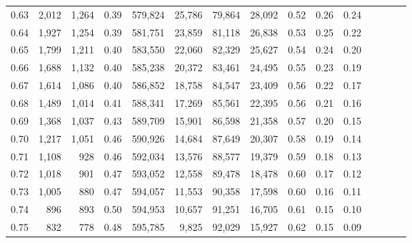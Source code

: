\begin{tabular}{rrrcrrrrrrrrrrr}
0.63 &   2,012 &  1,264 &                                       0.39 &  579,824 &   25,786 &   79,864 &   28,092 &  0.52 &  0.26 &                         0.24 \\
0.64 &   1,927 &  1,254 &                                       0.39 &  581,751 &   23,859 &   81,118 &   26,838 &  0.53 &  0.25 &                         0.22 \\
0.65 &   1,799 &  1,211 &                                       0.40 &  583,550 &   22,060 &   82,329 &   25,627 &  0.54 &  0.24 &                         0.20 \\
0.66 &   1,688 &  1,132 &                                       0.40 &  585,238 &   20,372 &   83,461 &   24,495 &  0.55 &  0.23 &                         0.19 \\
0.67 &   1,614 &  1,086 &                                       0.40 &  586,852 &   18,758 &   84,547 &   23,409 &  0.56 &  0.22 &                         0.17 \\
0.68 &   1,489 &  1,014 &                                       0.41 &  588,341 &   17,269 &   85,561 &   22,395 &  0.56 &  0.21 &                         0.16 \\
0.69 &   1,368 &  1,037 &                                       0.43 &  589,709 &   15,901 &   86,598 &   21,358 &  0.57 &  0.20 &                         0.15 \\
0.70 &   1,217 &  1,051 &                                       0.46 &  590,926 &   14,684 &   87,649 &   20,307 &  0.58 &  0.19 &                         0.14 \\
0.71 &   1,108 &    928 &                                       0.46 &  592,034 &   13,576 &   88,577 &   19,379 &  0.59 &  0.18 &                         0.13 \\
0.72 &   1,018 &    901 &                                       0.47 &  593,052 &   12,558 &   89,478 &   18,478 &  0.60 &  0.17 &                         0.12 \\
0.73 &   1,005 &    880 &                                       0.47 &  594,057 &   11,553 &   90,358 &   17,598 &  0.60 &  0.16 &                         0.11 \\
0.74 &     896 &    893 &                                       0.50 &  594,953 &   10,657 &   91,251 &   16,705 &  0.61 &  0.15 &                         0.10 \\
0.75 &     832 &    778 &                                       0.48 &  595,785 &    9,825 &   92,029 &   15,927 &  0.62 &  0.15 &                         0.09 \\

\end{tabular}
